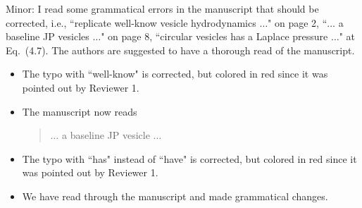 \documentclass[11pt]{article}
\newcommand{\comment}[1]{{\color{blue} #1}}
\begin{document}
\noindent
\comment{Minor: I read some grammatical errors in the manuscript that
should be corrected, i.e., ``replicate well-know vesicle hydrodynamics
$\ldots$" on page 2, ``$\ldots$ a baseline JP vesicles $\ldots$" on page
8, ``circular vesicles has a Laplace pressure $\ldots$" at Eq.~(4.7).
The authors are suggested to have a thorough read of the manuscript.}
\begin{itemize}
  \item The typo with ``well-know" is corrected, but colored in red
    since it was pointed out by Reviewer 1.

  \item The manuscript now reads
    \begin{quotation}
      $\ldots$ a baseline JP vesicle $\ldots$
    \end{quotation}

  \item The typo with ``has" instead of ``have" is corrected, but
    colored in red since it was pointed out by Reviewer 1.

  \item We have read through the manuscript and made grammatical
    changes.

\end{itemize}
\end{document}
